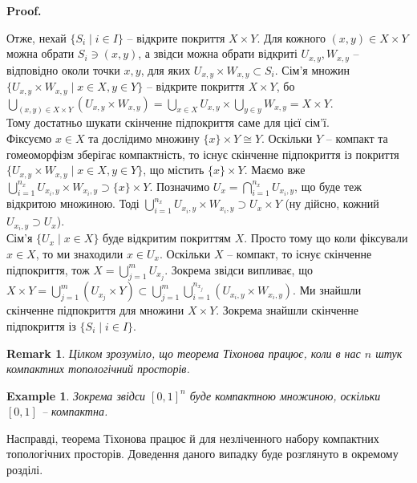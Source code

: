 \documentclass[a4paper, 10pt]{article}
\makeatletter
\theoremstyle{theoremdd}
\newtheorem{example}[theorem]{Example}
\newtheorem{remark}[theorem]{Remark}
\renewenvironment{proof}[1][Proof.\\]{\par
\pushQED{\hfill \qed}%
\normalfont \topsep6\p@\@plus6\p@\relax
\trivlist
\item\relax
{\bfseries
#1\@addpunct{.}}\hspace\labelsep\ignorespaces
}{%
\popQED\endtrivlist\@endpefalse
}
\makeatother
\begin{document}
\begin{proof}
Отже, нехай $\{S_i \mid i \in I\}$ -- відкрите покриття $X \times Y$. Для кожного $(x,y) \in X \times Y$ можна обрати $S_i \ni (x,y)$, а звідси можна обрати відкриті $U_{x,y}, W_{x,y}$ -- відповідно околи точки $x,y$, для яких $U_{x,y} \times W_{x,y} \subset S_i$. Сім'я множин $\{U_{x,y} \times W_{x,y} \mid x \in X, y \in Y\}$ -- відкрите покриття $X \times Y$, бо\\
$\displaystyle\bigcup_{(x,y) \in X \times Y} (U_{x,y} \times W_{x,y}) = \bigcup_{x \in X} U_{x,y} \times \bigcup_{y \in y} W_{x,y} = X \times Y$.\\
Тому достатньо шукати скінченне підпокриття саме для цієї сім'ї.\\
Фіксуємо $x \in X$ та дослідимо множину $\{x\} \times Y \cong Y$. Оскільки $Y$ -- компакт та гомеоморфізм зберігає компактність, то існує скінченне підпокриття із покриття $\{U_{x,y} \times W_{x,y} \mid x \in X, y \in Y\}$, що містить $\{x\} \times Y$. Маємо вже $\displaystyle\bigcup_{i=1}^{n_x} U_{x_i,y} \times W_{x_i,y} \supset \{x\} \times Y$. Позначимо $U_x = \displaystyle\bigcap_{i=1}^{n_x} U_{x_i,y}$, що буде теж відкритою множиною. Тоді $\displaystyle\bigcup_{i=1}^{n_x} U_{x_i,y} \times W_{x_i,y} \supset U_x \times Y$ (ну дійсно, кожний $U_{x_i,y} \supset U_x$). \\
Сім'я $\{U_x \mid x \in X\}$ буде відкритим покриттям $X$. Просто тому що коли фіксували $x \in X$, то ми знаходили $x \in U_x$. Оскільки $X$ -- компакт, то існує скінченне підпокриття, тож $X = \displaystyle\bigcup_{j=1}^m U_{x_j}$. Зокрема звідси випливає, що $X \times Y = \displaystyle\bigcup_{j=1}^m (U_{x_j} \times Y) \subset \bigcup_{j=1}^m \bigcup_{i=1}^{n_{x_j}} (U_{x_i,y} \times W_{x_i,y})$. Ми знайшли скінченне підпокриття для множини $X \times Y$. Зокрема знайшли скінченне підпокриття із $\{S_i \mid i \in I\}$.
\end{proof}

\begin{remark}
Цілком зрозуміло, що теорема Тіхонова працює, коли в нас $n$ штук компактних топологічний просторів.
\end{remark}

\begin{example}
Зокрема звідси $[0,1]^n$ буде компактною множиною, оскільки $[0,1]$ -- компактна.
\end{example}
\noindent
Насправді, теорема Тіхонова працює й для незліченного набору компактних топологічних просторів. Доведення даного випадку буде розглянуто в окремому розділі.
\end{document}
